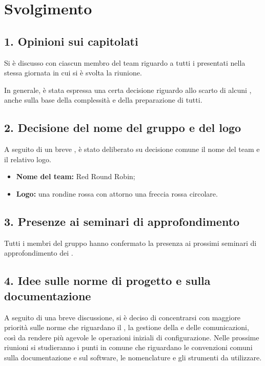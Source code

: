 \newpage
\section*{Svolgimento}

\subsection*{1. Opinioni sui capitolati}

Si è discusso con ciascun membro del team riguardo a tutti i  presentati nella stessa giornata in cui si è svolta la riunione.

In generale, è stata espressa una certa decisione riguardo allo scarto di alcuni , anche sulla base della complessità e della preparazione di tutti.

\subsection*{2. Decisione del nome del gruppo e del logo}

A seguito di un breve , è stato deliberato su decisione comune il nome del team e il relativo logo.

\begin{itemize}
	\item \textbf{Nome del team:} Red Round Robin;
	\item \textbf{Logo:} una rondine rossa con attorno una freccia rossa circolare.
\end{itemize}

\subsection*{3. Presenze ai seminari di approfondimento}

Tutti i membri del gruppo hanno confermato la presenza ai prossimi seminari di approfondimento dei .

\subsection*{4. Idee sulle norme di progetto e sulla documentazione}

A seguito di una breve discussione, si è deciso di concentrarsi con maggiore priorità sulle norme che riguardano il , la gestione della  e delle comunicazioni, così da rendere più agevole le operazioni iniziali di configurazione.
Nelle prossime riunioni si studieranno i punti in comune che riguardano le convenzioni comuni sulla documentazione e sul software, le nomenclature e gli strumenti da utilizzare.

